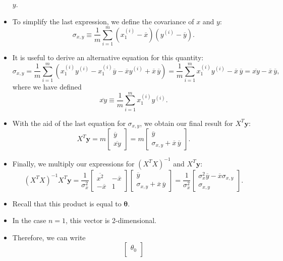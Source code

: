 \documentclass[10pt,american]{scrartcl}
\begin{document}
\begin{itemize}
$y$.
\item To simplify the last expression, we define the covariance of $x$
and $y$:
\[
\sigma_{x,y}\equiv\frac{1}{m}\sum_{i=1}^{m}\left(x_{1}^{\left(i\right)}-\overline{x}\right)\left(y^{\left(i\right)}-\overline{y}\right).
\]
\item It is useful to derive an alternative equation for this quantity:
\[
\sigma_{x,y}=\frac{1}{m}\sum_{i=1}^{m}\left(x_{1}^{\left(i\right)}y^{\left(i\right)}-x_{1}^{\left(i\right)}\overline{y}-\overline{x}y^{\left(i\right)}+\overline{x}\,\overline{y}\right)=\frac{1}{m}\sum_{i=1}^{m}x_{1}^{\left(i\right)}y^{\left(i\right)}-\overline{x}\,\overline{y}=\overline{xy}-\overline{x}\,\overline{y},
\]
where we have defined
\[
\overline{xy}\equiv\frac{1}{m}\sum_{i=1}^{m}x_{1}^{\left(i\right)}y^{\left(i\right)}.
\]
\item With the aid of the last equation for $\sigma_{x,y}$, we obtain our
final result for $X^{T}\mathbf{y}$:
\[
X^{T}\mathbf{y}=m\begin{bmatrix}\overline{y}\\
\overline{xy}
\end{bmatrix}=m\begin{bmatrix}\overline{y}\\
\sigma_{x,y}+\overline{x}\,\overline{y}
\end{bmatrix}.
\]
\item Finally, we multiply our expressions for $\left(X^{T}X\right)^{-1}$
and $X^{T}\mathbf{y}$:
\[
\left(X^{T}X\right)^{-1}X^{T}\mathbf{y}=\frac{1}{\sigma_{x}^{2}}\begin{bmatrix}\overline{x^{2}} & -\overline{x}\\
-\overline{x} & 1
\end{bmatrix}\begin{bmatrix}\overline{y}\\
\sigma_{x,y}+\overline{x}\,\overline{y}
\end{bmatrix}=\frac{1}{\sigma_{x}^{2}}\begin{bmatrix}\sigma_{x}^{2}\overline{y}-\overline{x}\sigma_{x,y}\\
\sigma_{x,y}
\end{bmatrix}.
\]
\item Recall that this product is equal to $\boldsymbol{\theta}$.
\item In the case $n=1$, this vector is 2-dimensional.
\item Therefore, we can write
\[
\begin{bmatrix}\theta_{0}\\

\end{bmatrix}\]
\end{itemize}
\end{document}
